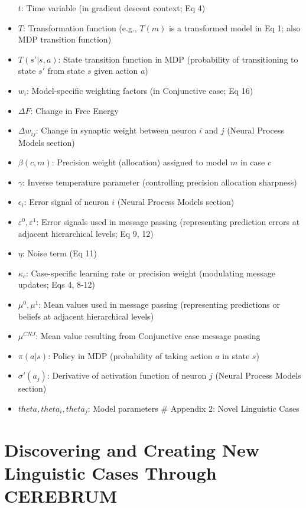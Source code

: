 \documentclass[
]{book}
\begin{document}
\begin{itemize}
  \(t\): Time variable (in gradient descent context; Eq 4)
\item
  \(T\): Transformation function (e.g., \(T(m)\) is a transformed model
  in Eq 1; also MDP transition function)
\item
  \(T(s'|s,a)\): State transition function in MDP (probability of
  transitioning to state \(s'\) from state \(s\) given action \(a\))
\item
  \(w_i\): Model-specific weighting factors (in Conjunctive case; Eq 16)
\item
  \(\Delta F\): Change in Free Energy
\item
  \(\Delta w_{ij}\): Change in synaptic weight between neuron \(i\) and
  \(j\) (Neural Process Models section)
\item
  \(\beta(c,m)\): Precision weight (allocation) assigned to model \(m\)
  in case \(c\)
\item
  \(\gamma\): Inverse temperature parameter (controlling precision
  allocation sharpness)
\item
  \(\epsilon_i\): Error signal of neuron \(i\) (Neural Process Models
  section)
\item
  \(\varepsilon^0, \varepsilon^1\): Error signals used in message
  passing (representing prediction errors at adjacent hierarchical
  levels; Eq 9, 12)
\item
  \(\eta\): Noise term (Eq 11)
\item
  \(\kappa_c\): Case-specific learning rate or precision weight
  (modulating message updates; Eqs 4, 8-12)
\item
  \(\mu^0, \mu^1\): Mean values used in message passing (representing
  predictions or beliefs at adjacent hierarchical levels)
\item
  \(\mu^{CNJ}\): Mean value resulting from Conjunctive case message
  passing
\item
  \(\pi(a|s)\): Policy in MDP (probability of taking action \(a\) in
  state \(s\))
\item
  \(\sigma'(a_j)\): Derivative of activation function of neuron \(j\)
  (Neural Process Models section)
\item
  \(theta, theta_i, theta_j\): Model parameters \# Appendix 2: Novel
  Linguistic Cases
\end{itemize}

\hypertarget{discovering-and-creating-new-linguistic-cases-through-cerebrum}{%
\section{Discovering and Creating New Linguistic Cases Through
CEREBRUM}\label{discovering-and-creating-new-linguistic-cases-through-cerebrum}}
\end{document}
